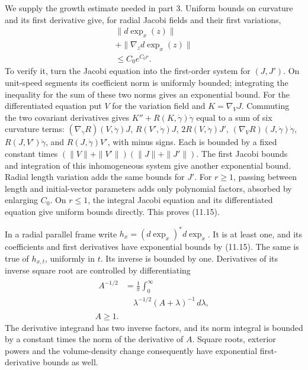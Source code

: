 \documentclass[
  11pt,
]{article}
\begin{document}
We supply the growth estimate needed in part 3. Uniform bounds on
curvature and its first derivative give, for radial Jacobi fields and
their first variations, \[
\begin{gathered}
\|d\exp_x(z)\|\\
+\|\nabla_zd\exp_x(z)\|\\
\leq C_0e^{C_0r}.
\end{gathered}
\tag{11.15}
\] To verify it, turn the Jacobi equation into the first-order system
for \((J,J')\). On unit-speed segments its coefficient norm is uniformly
bounded; integrating the inequality for the sum of these two norms gives
an exponential bound. For the differentiated equation put \(V\) for the
variation field and \(K=\nabla_VJ\). Commuting the two covariant
derivatives gives \(K''+R(K,\dot\gamma)\dot\gamma\) equal to a sum of
six curvature terms: \((\nabla_{\dot\gamma}R)(V,\dot\gamma)J\),
\(R(V',\dot\gamma)J\), \(2R(V,\dot\gamma)J'\),
\((\nabla_VR)(J,\dot\gamma)\dot\gamma\), \(R(J,V')\dot\gamma\), and
\(R(J,\dot\gamma)V'\), with minus signs. Each is bounded by a fixed
constant times \((\|V\|+\|V'\|)(\|J\|+\|J'\|)\). The first Jacobi bounds
and integration of this inhomogeneous system give another exponential
bound. Radial length variation adds the same bounds for \(J'\). For
\(r\geq1\), passing between length and initial-vector parameters adds
only polynomial factors, absorbed by enlarging \(C_0\). On \(r\leq1\),
the integral Jacobi equation and its differentiated equation give
uniform bounds directly. This proves (11.15).

In a radial parallel frame write \(h_x=(d\exp_x)^*d\exp_x\). It is at
least one, and its coefficients and first derivatives have exponential
bounds by (11.15). The same is true of \(h_{x,t}\), uniformly in \(t\).
Its inverse is bounded by one. Derivatives of its inverse square root
are controlled by differentiating \[
\begin{gathered}
\begin{aligned}
A^{-1/2}&=\frac1\pi\int_0^\infty\\
&\quad\lambda^{-1/2}(A+\lambda)^{-1}\,d\lambda,
\end{aligned}\\
A\geq1.
\end{gathered}
\tag{11.16}
\] The derivative integrand has two inverse factors, and its norm
integral is bounded by a constant times the norm of the derivative of
\(A\). Square roots, exterior powers and the volume-density change
consequently have exponential first-derivative bounds as well.
\end{document}
